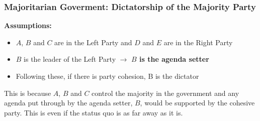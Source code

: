 \documentclass[12pt, letterpaper]{article}
\begin{document}
\subsubsection{Majoritarian Goverment: Dictatorship of the Majority Party}
\textbf{Assumptions:}
\begin{itemize}
	\item $A$, $B$ and $C$ are in the Left Party and $D$ and $E$ are in the Right Party
	\item $B$ is the leader of the Left Party $\rightarrow$ \textbf{$B$ is the agenda setter}
	\item Following these, if there is party cohesion, B is the dictator
\end{itemize}

\begin{center}
\end{center}
This is because $A$, $B$ and $C$ control the majority in the government and any agenda put through by the agenda setter, $B$, would be supported by the cohesive party. This is even if the status quo is as far away as it is.
\end{document}

